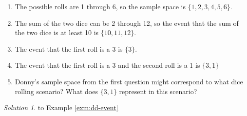\documentclass[
]{book}
\providecommand{\tightlist}{%
  \setlength{\itemsep}{0pt}\setlength{\parskip}{0pt}}
\theoremstyle{definition}
\theoremstyle{definition}
\theoremstyle{definition}
\theoremstyle{remark}
\newtheorem*{solution}{Solution}
\begin{document}
\begin{enumerate}
\def\labelenumi{\arabic{enumi}.}
\tightlist
\item
  The possible rolls are 1 through 6, so the sample space is \(\{1, 2, 3, 4, 5, 6\}\).
\item
  The sum of the two dice can be 2 through 12, so the event that the sum of the two dice is at least 10 is \(\{10, 11, 12\}\).
\item
  The event that the first roll is a 3 is \(\{3\}\).
\item
  The event that the first roll is a 3 and the second roll is a 1 is \(\{3, 1\}\)
\item
  Donny's sample space from the first question might correspond to what dice rolling scenario? What does \(\{3, 1\}\) represent in this scenario?
\end{enumerate}

\begin{solution}
{}to Example \ref{exm:dd-event}
\end{solution}
\end{document}
